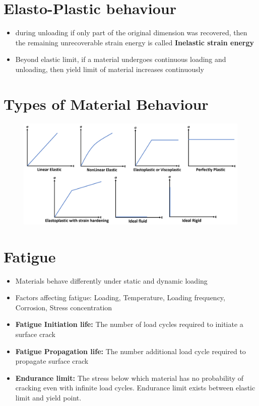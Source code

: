 \documentclass[8pt]{report}
\begin{document}
	\section{Elasto-Plastic behaviour}
		\begin{itemize}
			\item during unloading if only part of the original dimension was recovered, then the remaining unrecoverable strain energy is called \textbf{Inelastic strain energy}
			\item Beyond elastic limit, if a material undergoes continuous loading and unloading, then yield limit of material increases continuously
		\end{itemize}\hrulefill
	\section{Types of Material Behaviour}
		\begin{figure}[H]
			\centering
			\includegraphics[scale=0.25]{Typesofmaterialbehaviour.png}
		\end{figure}
	\section{Fatigue}
		\begin{itemize}
			\item Materials behave differently under static and dynamic loading
			\item Factors affecting fatigue: Loading, Temperature, Loading frequency, Corrosion, Stress concentration
			\item \textbf{Fatigue Initiation life: }The number of load cycles required to initiate a surface crack
			\item \textbf{Fatigue Propagation life: }The number additional load cycle required to propagate surface crack
			\item \textbf{Endurance limit: }The stress below which material has no probability of cracking even with infinite load cycles. Endurance limit exists between elastic limit and yield point.
		\end{itemize}\hrulefill
\end{document}
